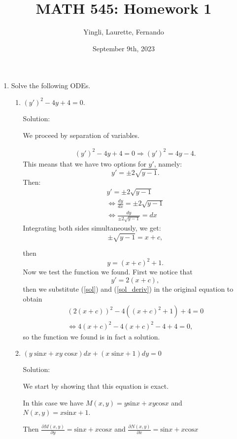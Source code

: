 \documentclass{article}
\title{MATH 545: Homework 1}
\author{Yingli, Laurette, Fernando}
\date{September 9th, 2023}
\begin{document}
\maketitle
\begin{enumerate}
\item Solve the following ODEs.
\begin{enumerate}
	\item $(y')^2 -4y +4 = 0.$

		Solution:

		We proceed by separation of variables.

		\begin{align*}
			(y')^2 -4y +4 = 0 \Longrightarrow (y')^2 = 4y -4.
		\end{align*}
		This means that we have two options for $y'$, namely:
		\[y' = \pm 2\sqrt{y-1}.\]
		Then:
		\begin{align*}
			y' = \pm 2\sqrt{y-1} \\
			\iff \frac{dy}{dx} = \pm 2\sqrt{y-1} \\
			\iff \frac{dy}{\pm 2\sqrt{y-1}} = dx
		\end{align*}
		Integrating both sides simultaneously, we get:
		\[\pm \sqrt{y-1} = x+c,\]

		then
		\begin{equation} \label{sol}
			y = (x+c)^2 + 1.
		\end{equation}
		Now we test the function we found. First we notice that
		\begin{equation} \label{sol_deriv}
			y' = 2(x+c),
		\end{equation}
		then we substitute (\ref{sol}) and (\ref{sol_deriv}) in the original equation to obtain
		\begin{align*}
			(2(x+c))^2 -4((x+c)^2 + 1) +4 =0 \\
			\iff 4(x+c)^2 -4(x+c)^2 -4 + 4 =0,
		\end{align*}
		so the function we found is in fact a solution.

	\item $(y\;\text{sin} x + xy\;\text{cos}x)dx + (x\;\text{sin}x + 1)dy = 0$

		Solution:
		
		We start by showing that this equation is exact.

		In this case we have $M(x,y) = y\text{sin}x + xy\text{cos}x$ and $N(x,y) = x\text{sin}x + 1$.

		Then $\frac{\partial M(x,y)}{\partial y} = \text{sin}x + x\text{cos}x$ and $\frac{\partial N(x,y)}{\partial x} = \text{sin}x + x\text{cos}x$


\end{enumerate}
\end{enumerate}
\end{document}
